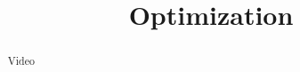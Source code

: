 \documentclass[handout]{ximera}
\title{Optimization}
\begin{document}
\begin{abstract} Video %
\end{abstract}

\maketitle

\end{document}
